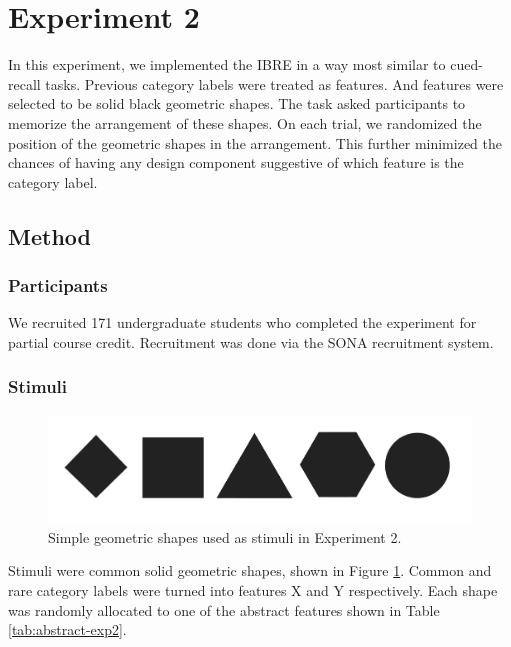 \documentclass[10pt,letterpaper]{article}
\begin{document}
\section{Experiment 2}

In this experiment, we implemented the IBRE in a way most similar to cued-recall tasks.
Previous category labels were treated as features.
And features were selected to be solid black geometric shapes.
The task asked participants to memorize the arrangement of these shapes.
On each trial, we randomized the position of the geometric shapes in the arrangement.
This further minimized the chances of having any design component suggestive of which feature is the category label.

\subsection{Method}

\subsubsection{Participants}

We recruited 171 undergraduate students who completed the experiment for partial course credit.
Recruitment was done via the SONA recruitment system. \\

\subsubsection{Stimuli}

\begin{figure}
  \begin{center}
    \caption{Simple geometric shapes used as stimuli in Experiment 2.}
    \label{figure:exp2-stimuli}
    \includegraphics[scale=0.15]{figures/experiment_2_stimuli.pdf}
  \end{center}
\end{figure}

Stimuli were common solid geometric shapes, shown in Figure \ref*{figure:exp2-stimuli}.
Common and rare category labels were turned into features X and Y respectively.
Each shape was randomly allocated to one of the abstract features shown in Table \ref*{tab:abstract-exp2}.
\end{document}

